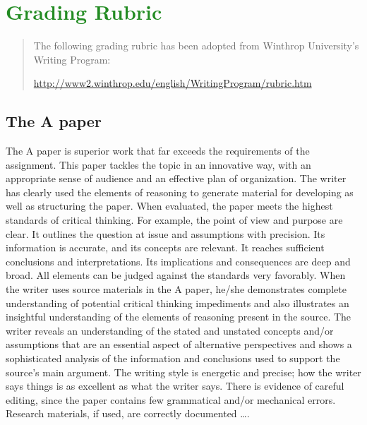 
\section{\textcolor{ForestGreen}{Grading Rubric}}

\begin{quote}
The following grading rubric has been adopted from Winthrop University's Writing Program:


\url{http://www2.winthrop.edu/english/WritingProgram/rubric.htm}

\end{quote}

\subsection{The A paper}
The A paper is superior work that far exceeds the requirements of the assignment. This paper tackles the topic in an innovative way, with an appropriate sense of audience and an effective plan of organization. The writer has clearly used the elements of reasoning to generate material for developing as well as structuring the paper. When evaluated, the paper meets the highest standards of critical thinking. For example, the point of view and purpose are clear. It outlines the question at issue and assumptions with precision. Its information is accurate, and its concepts are relevant. It reaches sufficient conclusions and interpretations. Its implications and consequences are deep and broad. All elements can be judged against the standards very favorably. When the writer uses source materials in the A paper, he/she demonstrates complete understanding of potential critical thinking impediments and also illustrates an insightful understanding of the elements of reasoning present in the source. The writer reveals an understanding of the stated and unstated concepts and/or assumptions that are an essential aspect of alternative perspectives and shows a sophisticated analysis of the information and conclusions used to support the source’s main argument. The writing style is energetic and precise; how the writer says things is as excellent as what the writer says. There is evidence of careful editing, since the paper contains few grammatical and/or mechanical errors. Research materials, if used, are correctly documented \dots.

